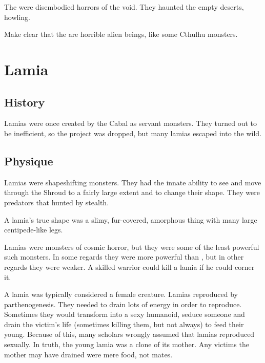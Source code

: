 The \jinn were disembodied horrors of the void.
They haunted the empty deserts, howling. 

Make clear that the \jinn are horrible alien beings, like some Cthulhu monsters.

















\section{Lamia}









\subsection{History}
Lamias were once created by the Cabal as servant monsters. 
They turned out to be inefficient, so the project was dropped, but many lamias escaped into the wild. 









\subsection{Physique}
Lamias were shapeshifting monsters. 
They had the innate ability to see and move through the Shroud to a fairly large extent and to change their shape. 
They were predators that hunted by stealth. 

A lamia's true shape was a slimy, fur-covered, amorphous thing with many large centipede-like legs. 

Lamias were monsters of cosmic horror, but they were some of the least powerful such monsters. 
In some regards they were more powerful than \humans, but in other regards they were weaker. 
A skilled \human warrior could kill a lamia if he could corner it. 

A lamia was typically considered a female creature. 
Lamias reproduced by parthenogenesis. 
They needed to drain lots of energy in order to reproduce. 
Sometimes they would transform into a sexy humanoid, seduce someone and drain the victim's life (sometimes killing them, but not always) to feed their young.
Because of this, many scholars wrongly assumed that lamias reproduced sexually. 
In truth, the young lamia was a clone of its mother. 
Any victims the mother may have drained were mere food, not mates. 

